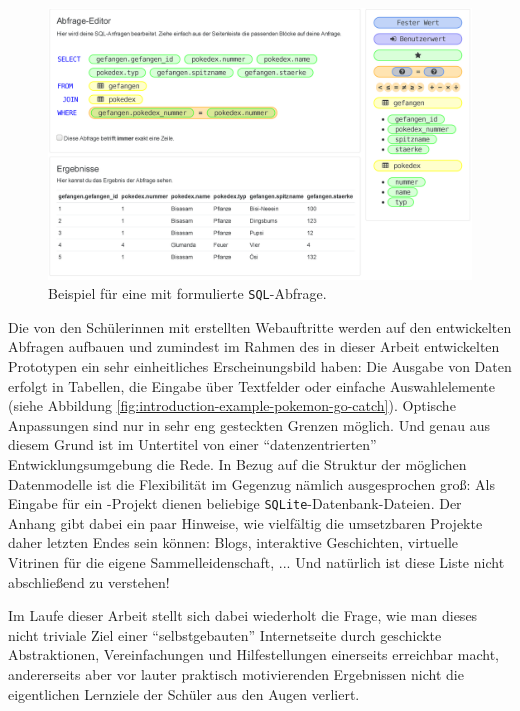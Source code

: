 \begin{figure}[p]
  \includegraphics[width=\textwidth]{images/screenshots/20161019/enduser-pokemongo-query-editor.png}
  \caption{Beispiel für eine mit \idename{} formulierte \texttt{SQL}-Abfrage.}
  \label{fig:introduction-example-pokemon-go-query-editor}
\end{figure}

Die von den Schülerinnen mit \idename{} erstellten Webauftritte werden auf den entwickelten Abfragen aufbauen und zumindest im Rahmen des in dieser Arbeit entwickelten Prototypen ein sehr einheitliches Erscheinungsbild haben: Die Ausgabe von Daten erfolgt in Tabellen, die Eingabe über Textfelder oder einfache Auswahlelemente (siehe Abbildung \ref{fig:introduction-example-pokemon-go-catch}). Optische Anpassungen sind nur in sehr eng gesteckten Grenzen möglich. Und genau aus diesem Grund ist im Untertitel von einer "`datenzentrierten"' Entwicklungsumgebung die Rede. In Bezug auf die Struktur der möglichen Datenmodelle ist die Flexibilität im Gegenzug nämlich ausgesprochen groß: Als Eingabe für ein \idename{}-Projekt dienen beliebige \texttt{SQLite}-Datenbank-Dateien. Der Anhang gibt dabei ein paar Hinweise, wie vielfältig die umsetzbaren Projekte daher letzten Endes sein können: Blogs, interaktive Geschichten, virtuelle Vitrinen für die eigene Sammelleidenschaft, ... Und natürlich ist diese Liste nicht abschließend zu verstehen!

Im Laufe dieser Arbeit stellt sich dabei wiederholt die Frage, wie man dieses nicht triviale Ziel einer "`selbstgebauten"' Internetseite durch geschickte Abstraktionen, Vereinfachungen und Hilfestellungen einerseits erreichbar macht, andererseits aber vor lauter praktisch motivierenden Ergebnissen nicht die eigentlichen Lernziele der Schüler aus den Augen verliert.

